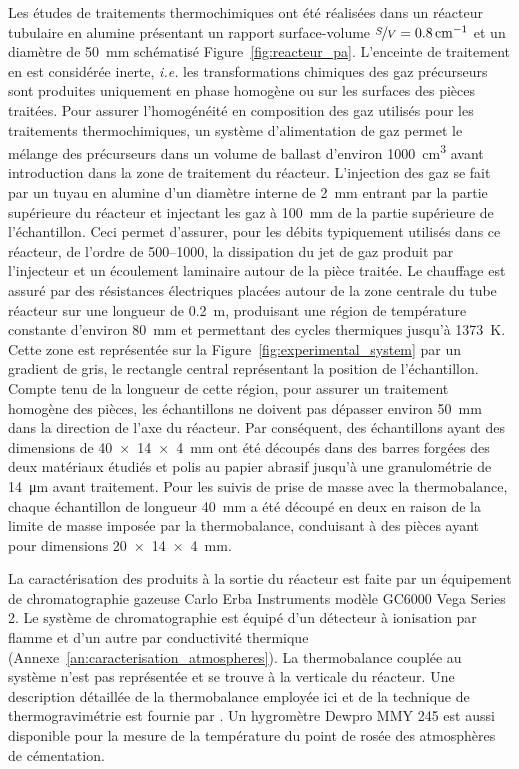 Les études de traitements thermochimiques ont été réalisées dans un réacteur tubulaire en alumine présentant un rapport surface-volume $\nicefrac{S}{V}=\SI{0,8}{\per\centi\metre}$ et un diamètre de \SI{50}{\milli\metre} schématisé Figure~\ref{fig:reacteur_pa}. L'enceinte de traitement en  est considérée inerte, \textit{i.e.} les transformations chimiques des gaz précurseurs sont produites uniquement en phase homogène ou sur les surfaces des pièces traitées.  Pour assurer l'homogénéité en composition des gaz utilisés pour les traitements thermochimiques, un système d'alimentation de gaz permet le mélange des précurseurs dans un volume de ballast d'environ \SI{1000}{\cubic\centi\metre} avant introduction dans la zone de traitement du réacteur. L'injection des gaz se fait par un tuyau en alumine d'un diamètre interne de \SI{2}{\milli\metre} entrant par la partie supérieure du réacteur et injectant les gaz à \SI{100}{\milli\metre} de la partie supérieure de l'échantillon. Ceci permet d'assurer, pour les débits typiquement utilisés dans ce réacteur, de l'ordre de \SIrange{500}{1000}{\sccm}, la dissipation du jet de gaz produit par l'injecteur et un écoulement laminaire autour de la pièce traitée. Le chauffage est assuré par des résistances électriques placées autour de la zone centrale du tube réacteur sur une longueur de \SI{0,2}{\metre}, produisant une région de température constante d'environ \SI{80}{\milli\metre} et permettant des cycles thermiques jusqu'à \SI{1373}{\kelvin}. Cette zone est représentée sur la Figure~\ref{fig:experimental_system} par un gradient de gris, le rectangle central représentant la position de l'échantillon. Compte tenu de la longueur de cette région, pour assurer un traitement homogène des pièces, les échantillons ne doivent pas dépasser environ \SI{50}{\milli\metre} dans la direction de l'axe du réacteur. Par conséquent, des échantillons ayant des dimensions de \SI{40 x 14 x 4} {\milli\metre} ont été découpés dans des barres forgées des deux matériaux étudiés et polis au papier abrasif jusqu'à une granulométrie de \SI{14}{\micro\metre} avant traitement. Pour les suivis de prise de masse avec la thermobalance, chaque échantillon de longueur \SI{40}{\milli\metre} a été découpé en deux en raison de la limite de masse imposée par la thermobalance, conduisant à des pièces ayant pour dimensions \SI{20 x 14 x 4}{\milli\metre}. 

La caractérisation des produits à la sortie du réacteur est faite par un équipement de chromatographie gazeuse Carlo Erba Instruments modèle GC6000 Vega Series 2. Le système de chromatographie est équipé d'un détecteur à ionisation par flamme et d'un autre par conductivité thermique (Annexe~\ref{an:caracterisation_atmospheres}). La thermobalance couplée au système n'est pas représentée et se trouve à la verticale du réacteur. Une description détaillée de la thermobalance employée ici et de la technique de thermogravimétrie est fournie par \citet{Jaoul2004}. Un hygromètre Dewpro MMY 245 est aussi disponible pour la mesure de la température du point de rosée des atmosphères de cémentation.

